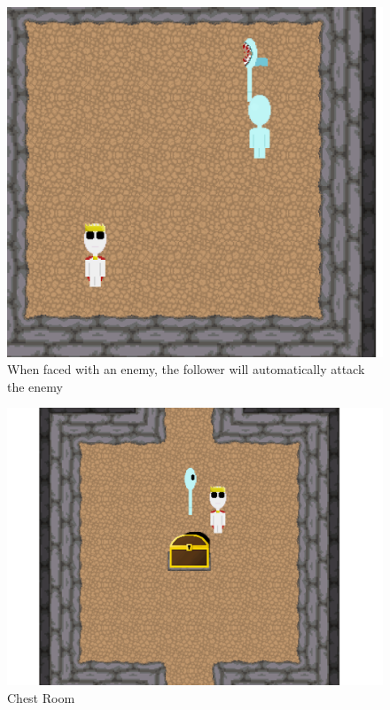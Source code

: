 \documentclass[../Main.tex]{subfiles}
\begin{document}
            \begin{figure}[hbt!]
                \centerline{\includegraphics[scale=0.4]{img/Testing/Objective/FollowerAttacking.png}}
                \caption{When faced with an enemy, the follower will automatically attack the enemy}
                \label{fig:FollowerAttacking}
            \end{figure}
            \begin{figure}[hbt!]
                \centerline{\includegraphics[scale=0.3]{img/Testing/Objective/ChestRoom.png}}
                \caption{Chest Room}
                \label{fig:ChestRoom}
            \end{figure}
\end{document}
